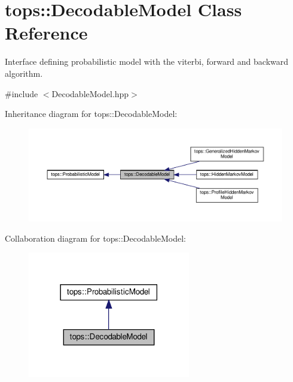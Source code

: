 \hypertarget{classtops_1_1DecodableModel}{}\section{tops\+:\+:Decodable\+Model Class Reference}
\label{classtops_1_1DecodableModel}


Interface defining probabilistic model with the viterbi, forward and backward algorithm.  




{\ttfamily \#include $<$Decodable\+Model.\+hpp$>$}



Inheritance diagram for tops\+:\+:Decodable\+Model\+:
\nopagebreak
\begin{figure}[H]
\begin{center}
\leavevmode
\includegraphics[width=350pt]{classtops_1_1DecodableModel__inherit__graph}
\end{center}
\end{figure}


Collaboration diagram for tops\+:\+:Decodable\+Model\+:
\nopagebreak
\begin{figure}[H]
\begin{center}
\leavevmode
\includegraphics[width=201pt]{classtops_1_1DecodableModel__coll__graph}
\end{center}
\end{figure}

